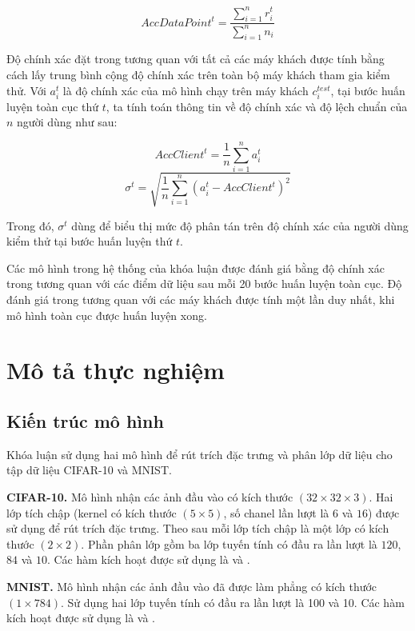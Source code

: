 \begin{equation}
    AccDataPoint^t = \frac{\sum_{i=1}^{n} r_i^t}{\sum_{i=1}^{n} n_i}
\end{equation}

Độ chính xác đặt trong tương quan với tất cả các máy khách được tính bằng cách lấy trung bình cộng độ chính xác trên toàn bộ máy khách tham gia kiểm thử. Với $a_i^t$ là độ chính xác của mô hình chạy trên máy khách $c_i^{test}$, tại bước huấn luyện toàn cục thứ $t$, ta tính toán thông tin về độ chính xác và độ lệch chuẩn của $n$ người dùng như sau:

\begin{equation}
    AccClient^t = \frac{1}{n} \sum_{i=1}^n a_i^t
\end{equation}
\begin{equation}
    \sigma^t = \sqrt{\frac{1}{n} \sum_{i=1}^n {(a_i^t - AccClient^t)^2}}
\end{equation}

Trong đó, $\sigma^t$ dùng để biểu thị mức độ phân tán trên độ chính xác của người dùng kiểm thử tại bước huấn luyện thứ $t$.

Các mô hình trong hệ thống của khóa luận được đánh giá bằng độ chính xác trong tương quan với các điểm dữ liệu sau mỗi 20 bước huấn luyện toàn cục. Độ đánh giá trong tương quan với các máy khách được tính một lần duy nhất, khi mô hình toàn cục được huấn luyện xong.

\section{Mô tả thực nghiệm}

\subsection{Kiến trúc mô hình}
\label{model_schema}

Khóa luận sử dụng hai mô hình để rút trích đặc trưng và phân lớp dữ liệu cho tập dữ liệu CIFAR-10 và MNIST.

\textbf{CIFAR-10.} Mô hình nhận các ảnh đầu vào có kích thước $(32\times32\times3)$. Hai lớp tích chập (kernel có kích thước $(5\times5)$, số chanel lần lượt là $6$ và $16$) được sử dụng để rút trích đặc trưng. Theo sau mỗi lớp tích chập là một lớp  có kích thước $(2\times2)$. Phần phân lớp gồm ba lớp tuyến tính có đầu ra lần lượt là $120$, $84$ và $10$. Các hàm kích hoạt được sử dụng là  và .

\textbf{MNIST.} Mô hình nhận các ảnh đầu vào đã được làm phẳng có kích thước $(1\times784)$. Sử dụng hai lớp tuyến tính có đầu ra lần lượt là 100 và 10. Các hàm kích hoạt được sử dụng là  và .

